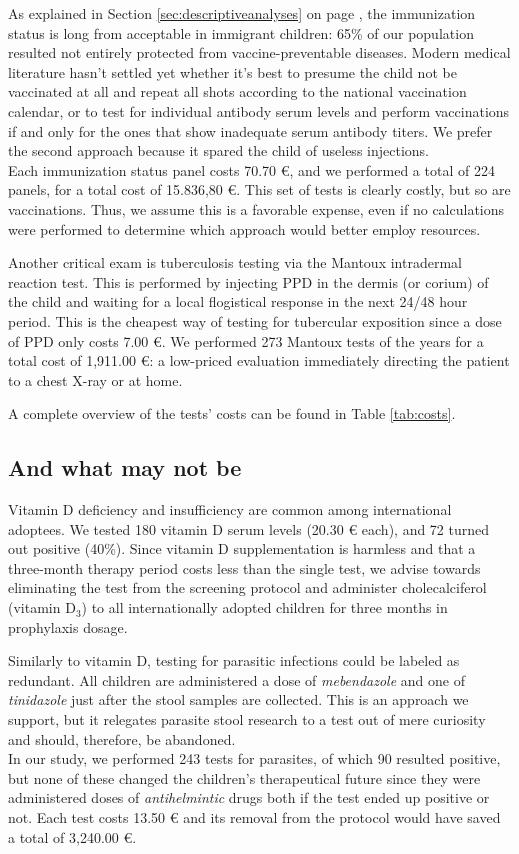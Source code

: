 As explained in Section \ref{sec:descriptiveanalyses} on page \pageref{sec:descriptiveanalyses}, the immunization status is long from acceptable in immigrant children: 65\% of our population resulted not entirely protected from vaccine-preventable diseases. Modern medical literature hasn't settled yet whether it's best to presume the child not be vaccinated at all and repeat all shots according to the national vaccination calendar, or to test for individual antibody serum levels and perform vaccinations if and only for the ones that show inadequate serum antibody titers. We prefer the second approach because it spared the child of useless injections.\\
Each immunization status panel costs 70.70 €, and we performed a total of 224 panels, for a total cost of 15.836,80 €. This set of tests  is clearly costly, but so are vaccinations. Thus, we assume this is a favorable expense, even if no calculations were performed to determine which approach would better employ resources.

Another critical exam is tuberculosis testing via the Mantoux intradermal reaction test. This is performed by injecting PPD in the dermis (or corium) of the child and waiting for a local flogistical response in the next 24/48 hour period. This is the cheapest way of testing for tubercular exposition since a dose of PPD only costs 7.00 €. We performed 273 Mantoux tests of the years for a total cost of 1,911.00 €: a low-priced evaluation immediately directing the patient to a chest X-ray or at home.

A complete overview of the tests' costs can be found in Table \ref{tab:costs}.

\subsection{And what may not be}\label{sub:notworthwhile}
Vitamin D deficiency and insufficiency are common among international adoptees. We tested 180 vitamin D serum levels (20.30 € each), and 72 turned out positive (40\%). Since vitamin D supplementation is harmless and that a three-month therapy period costs less than the single test, we advise towards eliminating the test from the screening protocol and administer cholecalciferol (vitamin D$_3$) to all internationally adopted children for three months in prophylaxis dosage.

Similarly to vitamin D, testing for parasitic infections could be labeled as redundant. All children are administered a dose of \textit{mebendazole} and one of \textit{tinidazole} just after the stool samples are collected. This is an approach we support, but it relegates parasite stool research to a test out of mere curiosity and should, therefore, be abandoned.\\
In our study, we performed 243 tests for parasites, of which 90 resulted positive, but none of these changed the children's therapeutical future since they were administered doses of \textit{antihelmintic} drugs both if the test ended up positive or not. Each test costs 13.50 € and its removal from the protocol would have saved a total of 3,240.00 €.

